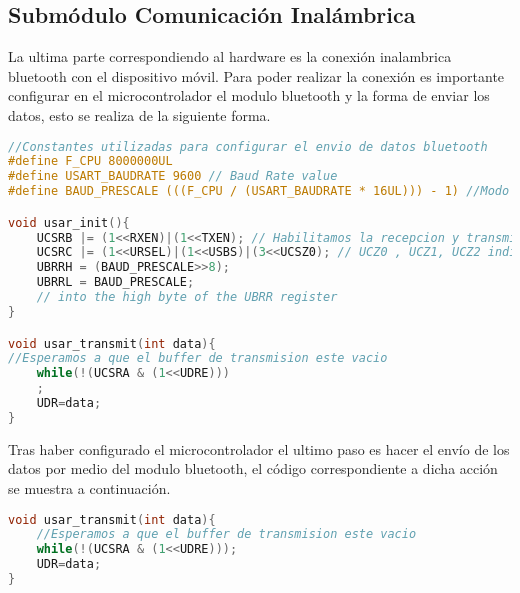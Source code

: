 \subsection{Submódulo Comunicación Inalámbrica}
La ultima parte correspondiendo al hardware es la conexión inalambrica bluetooth con el dispositivo móvil.\newline
Para poder realizar la conexión es importante configurar en el microcontrolador el modulo bluetooth y la forma de enviar los datos, esto se realiza de la siguiente forma.
\begin{lstlisting}[language=C]
//Constantes utilizadas para configurar el envio de datos bluetooth
#define F_CPU 8000000UL
#define USART_BAUDRATE 9600 // Baud Rate value
#define BAUD_PRESCALE (((F_CPU / (USART_BAUDRATE * 16UL))) - 1) //Modo asyncrono normal UBRR

void usar_init(){
	UCSRB |= (1<<RXEN)|(1<<TXEN); // Habilitamos la recepcion y transmision de datos
	UCSRC |= (1<<URSEL)|(1<<USBS)|(3<<UCSZ0); // UCZ0 , UCZ1, UCZ2 indican que se leen 8 bits
	UBRRH = (BAUD_PRESCALE>>8);
	UBRRL = BAUD_PRESCALE;       
	// into the high byte of the UBRR register
}

void usar_transmit(int data){
//Esperamos a que el buffer de transmision este vacio
	while(!(UCSRA & (1<<UDRE)))
	;
	UDR=data;
}
\end{lstlisting} 
Tras haber configurado el microcontrolador el ultimo paso es hacer el envío de los datos por medio del modulo bluetooth, el código correspondiente a dicha acción se muestra a continuación.
\begin{lstlisting}[language=C]
void usar_transmit(int data){
	//Esperamos a que el buffer de transmision este vacio
	while(!(UCSRA & (1<<UDRE)));
	UDR=data;
}
\end{lstlisting} 

